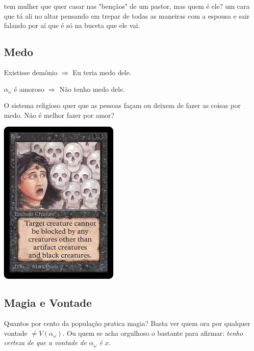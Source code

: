 \documentclass[12pt,a4paper]{article}
\begin{document}
			tem mulher que quer casar nas "ben\c{c}\~aos" de um pastor, mas quem \'e ele? um cara que t\'a ali no altar pensando em trepar de todas as maneiras com a espousa e sair falando por a\'i que \'e s\'o na buceta que ele vai. %

		\subsection{Medo}
			\begin{flushright}
			\end{flushright}

			Existisse dem\^onio $ \Rightarrow $ Eu teria medo dele.

			$ \alpha_\omega $ \'e amoroso\cite{x} $ \Rightarrow $ N\~ao tenho medo dele. %

			O sistema religioso quer que as pessoas fa\c{c}am ou deixem de fazer as coisas por medo. N\~ao \'e melhor fazer por amor\cite{x}?

			\begin{center}
			\includegraphics{fear}
			\end{center}

		\subsection{Magia e Vontade}
			\begin{flushright}
			\end{flushright}

			Quantos por cento da popula\c{c}\~ao pratica magia? Basta ver quem ora por qualquer vontade\cite{vontade} $ \neq V(\alpha_\omega) $. Ou quem se acha orgulhoso o bastante para afirmar: \emph{tenho certeza de que a vontade de $ \alpha_\omega $ \'e $x$.}
\end{document}
